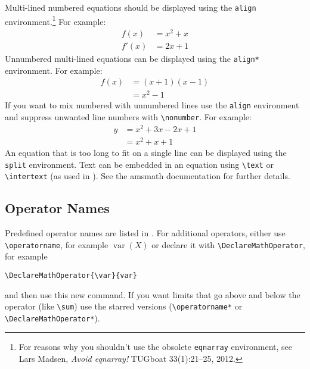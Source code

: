 \documentclass[tablecaption=bottom,wcp]{jmlr} %
\begin{document}
Multi-lined numbered equations should be displayed using the
\texttt{align} environment.\footnote{For reasons why you
  shouldn't use the obsolete \texttt{eqnarray} environment, see
  Lars Madsen, \emph{Avoid eqnarray!} TUGboat 33(1):21--25, 2012.} For example:
\begin{align}
  f(x)  & = x^2 + x\label{eq:f} \\
  f'(x) & = 2x + 1\label{eq:df}
\end{align}
Unnumbered multi-lined equations can be displayed using the
\texttt{align*} environment. For example:
\begin{align*}
  f(x) & = (x+1)(x-1) \\
       & = x^2 - 1
\end{align*}
If you want to mix numbered with unnumbered lines use the
\texttt{align} environment and suppress unwanted line numbers with
\verb|\nonumber|. For example:
\begin{align}
  y & = x^2 + 3x - 2x + 1\nonumber \\
    & = x^2 + x + 1\label{eq:y}
\end{align}
An equation that is too long to fit on a single line can be
displayed using the \texttt{split} environment.
Text can be embedded in an equation using \verb|\text| or
\verb|\intertext| (as used in ).
See the \textsf{amsmath} documentation for further details.

\subsection{Operator Names}
\label{sec:op}

Predefined operator names are listed in .
For additional operators, either use \verb|\operatorname|,
for example $\operatorname{var}(X)$ or declare it with
\verb|\DeclareMathOperator|, for example
\begin{verbatim}
\DeclareMathOperator{\var}{var}
\end{verbatim}
and then use this new command. If you want limits that go above and
below the operator (like \verb|\sum|) use the starred versions
(\verb|\operatorname*| or \verb|\DeclareMathOperator*|).
\end{document}
